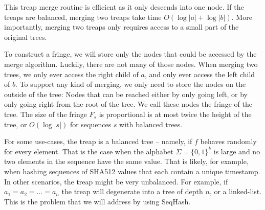 This treap merge routine is efficient as it only descends into one node. If
the treaps are balanced, merging two treaps take time $O(\log |a| + \log |b|)$.
More importantly, merging two treaps only requires access to a small part of
the original trees. 

To construct a fringe, we will store only the nodes that could be accessed by
the merge algorithm. Luckily, there are not many of those nodes.  When merging
two trees, we only ever access the right child of $a$, and only ever access the
left child of $b$. To support any kind of merging, we only need to store the
nodes on the outside of the tree: Nodes that can be reached either by only
going left, or by only going right from the root of the tree. We call these
nodes the fringe of the tree.  The size of the fringe $F_s$ is
proportional is at most twice the height of the tree, or $O(\log |s|)$ for
sequences $s$ with balanced trees.

%


For some use-cases, the treap is a balanced tree -- namely, if $f$ behaves
randomly for every element. That is the case when the alphabet $\Sigma =
\{0,1\}^k$ is large and no two elements in the sequence have the same value.
That is likely, for example, when hashing sequences of SHA512 values that each
contain a unique timestamp. In other scenarios, the treap might be very
unbalanced.  For example, if $a_1 = a_2 = \ldots = a_n$ the treap will
degenerate into a tree of depth $n$, or a linked-list. This is the problem that
we will address by using SeqHash. %

